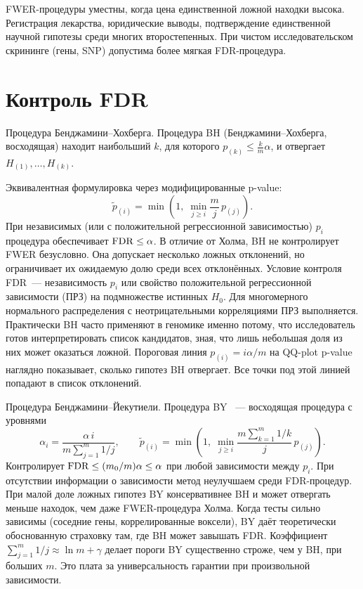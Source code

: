 FWER-процедуры уместны, когда цена единственной ложной находки высока. Регистрация лекарства, юридические выводы, подтверждение единственной научной гипотезы среди многих второстепенных.
При чистом исследовательском скрининге (гены, SNP) допустима более мягкая FDR-процедура.

\section{Контроль FDR}

Процедура Бенджамини--Хохберга. Процедура BH \citep{benjamini1995} (Бенджамини--Хохберга, восходящая) находит наибольший $k$, для которого $p_{(k)}\leq \frac{k}{m}\alpha$, и отвергает $H_{(1)},\ldots,H_{(k)}$.

Эквивалентная формулировка через модифицированные p-value:
\[ \tilde p_{(i)}=\min\!\left(1,\;\min_{j\geq i}\frac{m}{j}\,p_{(j)}\right).
\]
При независимых (или с положительной регрессионной зависимостью) $p_i$ процедура обеспечивает $\operatorname{FDR}\leq\alpha$.
В отличие от Холма, BH не контролирует FWER безусловно. Она допускает несколько ложных отклонений, но ограничивает их ожидаемую долю среди всех отклонённых.
Условие контроля FDR~--- независимость $p_i$ или свойство положительной регрессионной зависимости (ПРЗ) на подмножестве истинных $H_0$. Для многомерного нормального распределения с неотрицательными корреляциями ПРЗ выполняется.
Практически BH часто применяют в геномике именно потому, что исследователь готов интерпретировать список кандидатов, зная, что лишь небольшая доля из них может оказаться ложной.
Пороговая линия $p_{(i)}=i\alpha/m$ на QQ-plot p-value наглядно показывает, сколько гипотез BH отвергает. Все точки под этой линией попадают в список отклонений.

Процедура Бенджамини--Йекутиели. Процедура BY \citep{benjamini2001}~--- восходящая процедура с уровнями
\[ \alpha_i=\frac{\alpha\, i}{m\sum_{j=1}^{m}1/j},\qquad \tilde p_{(i)}=\min\!\left(1,\;\min_{j\geq i}\frac{m\sum_{k=1}^{m}1/k}{j}\,p_{(j)}\right).
\]
Контролирует $\operatorname{FDR}\leq (m_0/m)\alpha\leq\alpha$ при любой зависимости между $p_i$. При отсутствии информации о зависимости метод неулучшаем среди FDR-процедур.
При малой доле ложных гипотез BY консервативнее BH и может отвергать меньше находок, чем даже FWER-процедура Холма.
Когда тесты сильно зависимы (соседние гены, коррелированные воксели), BY даёт теоретически обоснованную страховку там, где BH может завышать FDR.
Коэффициент $\sum_{j=1}^{m}1/j\approx \ln m + \gamma$ делает пороги BY существенно строже, чем у BH, при больших $m$. Это плата за универсальность гарантии при произвольной зависимости.

